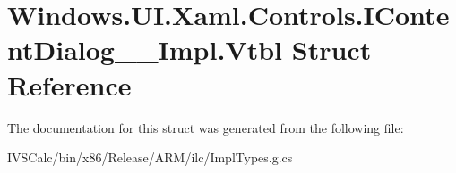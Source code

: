 \hypertarget{struct_windows_1_1_u_i_1_1_xaml_1_1_controls_1_1_i_content_dialog_____impl_1_1_vtbl}{}\section{Windows.\+U\+I.\+Xaml.\+Controls.\+I\+Content\+Dialog\+\_\+\+\_\+\+Impl.\+Vtbl Struct Reference}
\label{struct_windows_1_1_u_i_1_1_xaml_1_1_controls_1_1_i_content_dialog_____impl_1_1_vtbl}


The documentation for this struct was generated from the following file\+:\begin{DoxyCompactItemize}
\item 
I\+V\+S\+Calc/bin/x86/\+Release/\+A\+R\+M/ilc/Impl\+Types.\+g.\+cs\end{DoxyCompactItemize}
